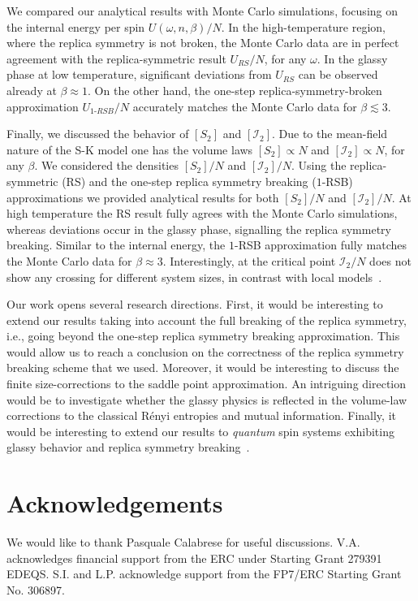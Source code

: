 \documentclass[twocolumn,superscriptaddress,prb,10pt]{revtex4-1}
\begin{document}
We compared our analytical results with Monte Carlo simulations, focusing on the internal 
energy per spin $U(\omega,n,\beta)/N$. In the high-temperature region, where the replica 
symmetry is not broken, the Monte Carlo data are in perfect agreement with the replica-symmetric 
result $U_{RS}/N$, for any $\omega$. In the glassy phase at low temperature, significant 
deviations from $U_{RS}$ can be observed already at $\beta\approx 1$. On the other hand, 
the one-step replica-symmetry-broken approximation $U_{1\textrm{-}RSB}/N$ accurately matches 
the Monte Carlo data for $\beta\lesssim 3$. 

Finally, we discussed the behavior of $[S_2]$ and $[{\mathcal I}_2]$. Due to the mean-field 
nature of the S-K model one has the volume laws $[S_2]\propto N$ and $[{\mathcal I}_2]\propto N$, 
for any $\beta$. We considered the densities $[S_2]/N$ and $[{\mathcal I}_2]/N$. Using the 
replica-symmetric (RS) and the one-step replica symmetry breaking ($1$-RSB) approximations we 
provided analytical results for both $[S_2]/N$ and $[{\mathcal I}_2]/N$. At high temperature the 
RS result fully agrees with the Monte Carlo simulations, whereas deviations occur in the 
glassy phase, signalling the replica symmetry breaking. Similar to the internal energy, 
the $1$-RSB approximation fully matches the Monte Carlo data for $\beta\approx 3$.
Interestingly, at the critical point ${\mathcal I}_2/N$ does not show any crossing for 
different system sizes, in contrast with local models~\cite{jaconis-2013}.

Our work opens several research directions. First, it would be interesting to extend our 
results taking into account the full breaking of the replica symmetry, i.e., going beyond 
the one-step replica symmetry breaking approximation. This would allow us to reach a 
conclusion on the correctness of the replica symmetry breaking scheme that we used. Moreover, 
it would be interesting to discuss the finite size-corrections to the saddle point 
approximation. An intriguing direction would be to investigate whether the glassy 
physics is reflected in the volume-law corrections to the classical R\'enyi entropies 
and mutual information. Finally, it would be interesting to extend our results to {\it quantum} 
spin systems exhibiting glassy behavior and replica symmetry breaking~\cite{read-1995,
andreanov-2012}. 



\section{Acknowledgements}
We would like to thank Pasquale Calabrese for useful discussions. V.A.  acknowledges  
financial support from the ERC under Starting Grant 279391 EDEQS. S.I. and L.P. 
acknowledge support  from the  FP7/ERC Starting Grant No. 306897. 
\end{document}
